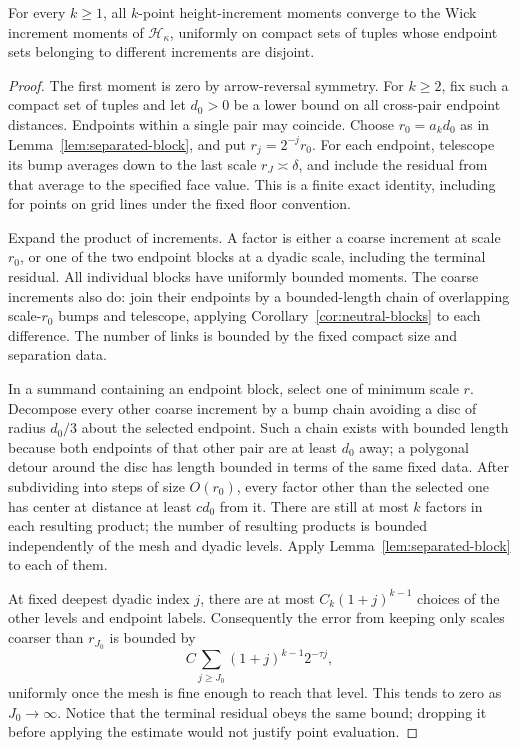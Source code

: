 \begin{proposition}\label{prop:offdiagonal}
For every \(k\ge1\), all \(k\)-point height-increment moments converge
to the Wick increment moments of \(\mathcal H_\kappa\), uniformly on
compact sets of tuples whose endpoint sets belonging to different
increments are disjoint.
\end{proposition}

\begin{proof}
The first moment is zero by arrow-reversal symmetry. For \(k\ge2\),
fix such a compact set of tuples and let \(d_0>0\) be a lower bound on
all cross-pair endpoint distances. Endpoints within a single pair may
coincide. Choose \(r_0=a_kd_0\) as in
Lemma~\ref{lem:separated-block}, and put \(r_j=2^{-j}r_0\).
For each endpoint, telescope its bump averages down to the last scale
\(r_J\asymp\delta\), and include the residual from that average to the
specified face value. This is a finite exact identity, including for
points on grid lines under the fixed floor convention.

Expand the product of increments. A factor is either a coarse
increment at scale \(r_0\), or one of the two endpoint blocks at a
dyadic scale, including the terminal residual. All individual blocks
have uniformly bounded moments. The coarse increments also do: join
their endpoints by a bounded-length chain of overlapping scale-\(r_0\)
bumps and telescope, applying Corollary~\ref{cor:neutral-blocks} to
each difference. The number of links is bounded by the fixed compact
size and separation data.

In a summand containing an endpoint block, select one of minimum scale
\(r\). Decompose every other coarse increment by a bump chain avoiding
a disc of radius \(d_0/3\) about the selected endpoint. Such a chain
exists with bounded length because both endpoints of that other pair
are at least \(d_0\) away; a polygonal detour around the disc has length
bounded in terms of the same fixed data. After subdividing into steps
of size \(O(r_0)\), every factor other than the selected one has center
at distance at least \(c d_0\) from it. There are still at most \(k\)
factors in each resulting product; the number of resulting products is
bounded independently of the mesh and dyadic levels. Apply
Lemma~\ref{lem:separated-block} to each of them.

At fixed deepest dyadic index \(j\), there are at most
\(C_k(1+j)^{k-1}\) choices of the other levels and endpoint labels.
Consequently the error from keeping only scales coarser than \(r_{J_0}\)
is bounded by
\begin{equation}\label{eq:prob-desmoothing-tail}
 C\sum_{j\ge J_0}(1+j)^{k-1}2^{-\tau j},
\end{equation}
uniformly once the mesh is fine enough to reach that level. This tends
to zero as \(J_0\to\infty\). Notice that the terminal residual obeys
the same bound; dropping it before applying the estimate would not
justify point evaluation.


\end{proof}
